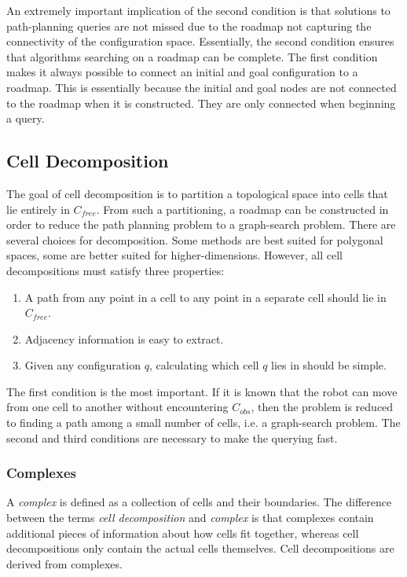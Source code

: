 \documentclass[10pt,conference]{ieeeconf}
\begin{document}
	An extremely important implication of the second condition is that solutions to path-planning queries are not missed due to the roadmap not capturing the connectivity of the configuration space. Essentially, the second condition ensures that algorithms searching on a roadmap can be complete. The first condition makes it always possible to connect an initial and goal configuration to a roadmap. This is essentially because the initial and goal nodes are not connected to the roadmap when it is constructed. They are only connected when beginning a query.
	
\subsection{Cell Decomposition}

The goal of cell decomposition is to partition a topological space into cells that lie entirely in $C_{free}$. From such a partitioning, a roadmap can be constructed in order to reduce the path planning problem to a graph-search problem. There are several choices for decomposition. Some methods are best suited for polygonal spaces, some are better suited for higher-dimensions. However, all cell decompositions must satisfy three properties:

\begin{enumerate}
\item A path from any point in a cell to any point in a separate cell should lie in $C_{free}$.

\item Adjacency information is easy to extract.

\item Given any configuration $q$, calculating which cell $q$ lies in should be simple.
\end{enumerate}

The first condition is the most important. If it is known that the robot can move from one cell to another without encountering $C_{obs}$, then the problem is reduced to finding a path among a small number of cells, i.e. a graph-search problem. The second and third conditions are necessary to make the querying fast.


\subsubsection{Complexes}

A \emph{complex} is defined as a collection of cells and their boundaries. The difference between the terms \emph{cell decomposition} and \emph{complex} is that complexes contain additional pieces of information about how cells fit together, whereas cell decompositions only contain the actual cells themselves. Cell decompositions are derived from complexes.
\end{document}
